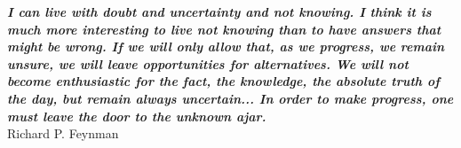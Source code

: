 \thispagestyle{empty}
\hbox{} \vfill
\begin{flushright}
\small \textit{\textbf{I can live with doubt and uncertainty and not knowing. I think it is much more interesting to live not knowing than to have answers that might be wrong. If we will only allow that, as we progress, we remain unsure, we will leave opportunities for alternatives. We will not become enthusiastic for the fact, the knowledge, the absolute truth of the day, but remain always uncertain... In order to make progress, one must leave the door to the unknown ajar.
}}
\\ \vspace{2mm}  
\scriptsize Richard P. Feynman
\end{flushright}

\clearpage
\thispagestyle{empty}
\cleardoublepage